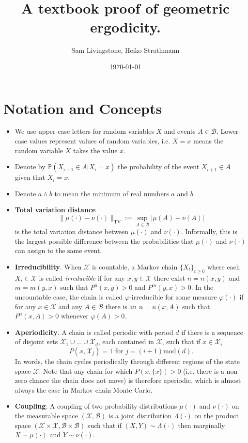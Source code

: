 \documentclass{article}
\title{\Large \bfseries A textbook proof of geometric ergodicity.}
\author{Sam Livingstone, Heiko Strathmann}
\date{\today}
\newcommand{\ch}[1]{ \{#1_t\}_{t \geq 0} }
\newcommand{\X}{\mathcal{X}}
\newcommand{\B}{\mathcal{B}}
\newcommand{\TV}{\text{TV}}
\begin{document}
\maketitle

\listoftodos

\section{Notation and Concepts}

\begin{itemize}
\item We use upper-case letters for random variables $X$ and events $A\in \mathcal{B}$. Lower-case values represent values of random variables, i.e. $X=x$ means the random variable $X$ takes the value $x$.
\item Denote by $\mathbb{P}(X_{i+1} \in A |X_i = x)$ the probability of the event $X_{i+1} \in A$ given that $X_i = x$.
\item Denote $a \wedge b$ to mean the minimum of real numbers $a$ and $b$
\item \textbf{Total variation distance}
\begin{equation*}
\|\mu(\cdot) - \nu(\cdot)\|_{\TV} := \sup_{A \in \mathcal{B}} |\mu(A) - \nu(A)|
\end{equation*}
is the total variation distance between $\mu(\cdot)$ and $\nu(\cdot)$. Informally, this is the largest possible difference between the probabilities that $\mu(\cdot)$ and $\nu(\cdot)$ can assign to the same event.
\item \textbf{Irreducibility}. When $\X$ is countable, a Markov chain $\ch{X}$ where each $X_i \in \X$ is called \emph{irreducible} if for any $x,y \in \X$ there exist $n = n(x,y)$ and $m = m(y,x)$ such that $P^n(x,y)>0$ and $P^m(y,x) > 0$.  In the uncountable case, the chain is called $\varphi$-irreducible for some measure $\varphi(\cdot)$ if for any $x \in \X$ and any $A \in \B$ there is an $n = n(x,A)$ such that $P^n(x,A) > 0$ whenever $\varphi(A) > 0$.
\item \textbf{Aperiodicity}. A chain is called periodic with period $d$ if there is a sequence of disjoint sets $\X_1 \cup ... \cup \X_d$, each contained in $\X$, such that if $x \in \X_i$
\[
P(x,\X_j) = 1 \text{ for } j = (i+1)\text{mod}(d).
\]
In words, the chain cycles periodically through different regions of the state space $\X$.  Note that any chain for which $P(x,\{x\}) > 0$ (i.e. there is a non-zero chance the chain does not move) is therefore aperiodic, which is almost always the case in Markov chain Monte Carlo.

\item \textbf{Coupling}.  A coupling of two probability distributions $\mu(\cdot)$ and $\nu(\cdot)$  on the measurable space $(\X,\B)$ is a joint distribution $\Lambda(\cdot)$ on the product space $(\X \times \X,\B \times \B)$ such that if $(X,Y) \sim \Lambda(\cdot)$ then marginally $X \sim \mu(\cdot)$ and $Y \sim \nu(\cdot)$.

\end{itemize}
\end{document}
